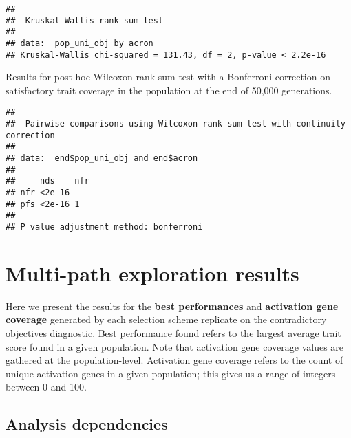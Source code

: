 \documentclass[]{book}
\newenvironment{Shaded}{\begin{snugshade}}{\end{snugshade}}
\newcommand{\DataTypeTok}[1]{\textcolor[rgb]{0.13,0.29,0.53}{#1}}
\newcommand{\KeywordTok}[1]{\textcolor[rgb]{0.13,0.29,0.53}{\textbf{#1}}}
\newcommand{\NormalTok}[1]{#1}
\newcommand{\OperatorTok}[1]{\textcolor[rgb]{0.81,0.36,0.00}{\textbf{#1}}}
\newcommand{\OtherTok}[1]{\textcolor[rgb]{0.56,0.35,0.01}{#1}}
\newcommand{\StringTok}[1]{\textcolor[rgb]{0.31,0.60,0.02}{#1}}
\begin{document}
\begin{verbatim}
## 
##  Kruskal-Wallis rank sum test
## 
## data:  pop_uni_obj by acron
## Kruskal-Wallis chi-squared = 131.43, df = 2, p-value < 2.2e-16
\end{verbatim}

Results for post-hoc Wilcoxon rank-sum test with a Bonferroni correction on satisfactory trait coverage in the population at the end of 50,000 generations.

\begin{Shaded}
\end{Shaded}

\begin{verbatim}
## 
##  Pairwise comparisons using Wilcoxon rank sum test with continuity correction 
## 
## data:  end$pop_uni_obj and end$acron 
## 
##     nds    nfr
## nfr <2e-16 -  
## pfs <2e-16 1  
## 
## P value adjustment method: bonferroni
\end{verbatim}

\hypertarget{multi-path-exploration-results}{%
\chapter{Multi-path exploration results}\label{multi-path-exploration-results}}

Here we present the results for the \textbf{best performances} and \textbf{activation gene coverage} generated by each selection scheme replicate on the contradictory objectives diagnostic.
Best performance found refers to the largest average trait score found in a given population.
Note that activation gene coverage values are gathered at the population-level.
Activation gene coverage refers to the count of unique activation genes in a given population; this gives us a range of integers between 0 and 100.

\hypertarget{analysis-dependencies-3}{%
\section{Analysis dependencies}\label{analysis-dependencies-3}}
\end{document}
